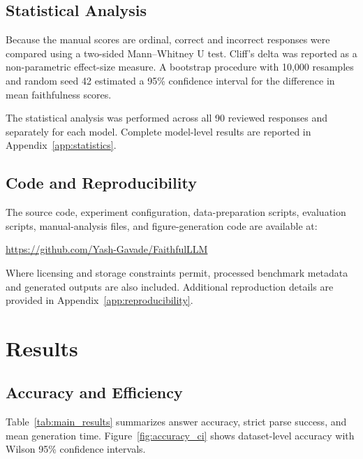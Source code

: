 \documentclass{article}
\begin{document}
\subsection{Statistical Analysis}

Because the manual scores are ordinal, correct and incorrect responses
were compared using a two-sided Mann--Whitney U test. Cliff's delta was
reported as a non-parametric effect-size measure. A bootstrap procedure
with 10,000 resamples and random seed 42 estimated a 95\% confidence
interval for the difference in mean faithfulness scores.

The statistical analysis was performed across all 90 reviewed responses
and separately for each model. Complete model-level results are reported
in Appendix~\ref{app:statistics}.

\subsection{Code and Reproducibility}

The source code, experiment configuration, data-preparation scripts,
evaluation scripts, manual-analysis files, and figure-generation code
are available at:

\begin{center}
\url{https://github.com/Yash-Gavade/FaithfulLLM}
\end{center}

Where licensing and storage constraints permit, processed benchmark
metadata and generated outputs are also included. Additional
reproduction details are provided in
Appendix~\ref{app:reproducibility}.





\section{Results}

\subsection{Accuracy and Efficiency}

Table~\ref{tab:main_results} summarizes answer accuracy, strict parse
success, and mean generation time. Figure~\ref{fig:accuracy_ci} shows
dataset-level accuracy with Wilson 95\% confidence intervals.
\end{document}
